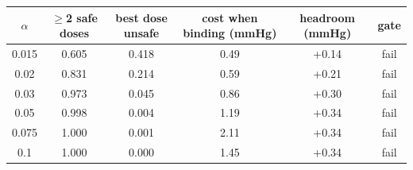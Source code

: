 \begin{tabular}{cccccc}
\toprule
$\alpha$ & $\geq$2 safe doses & best dose unsafe & cost when binding (mmHg) & headroom (mmHg) & gate \\
\midrule
0.015 & 0.605 & 0.418 & 0.49 & +0.14 & fail \\
0.02 & 0.831 & 0.214 & 0.59 & +0.21 & fail \\
0.03 & 0.973 & 0.045 & 0.86 & +0.30 & fail \\
0.05 & 0.998 & 0.004 & 1.19 & +0.34 & fail \\
0.075 & 1.000 & 0.001 & 2.11 & +0.34 & fail \\
0.1 & 1.000 & 0.000 & 1.45 & +0.34 & fail \\
\bottomrule
\end{tabular}
